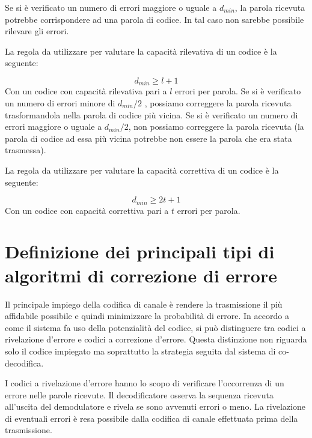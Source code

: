 \documentclass[LaM,binding=0.6cm,oneside]{../sapthesis}
\begin{document}
Se si è verificato un numero di errori maggiore o uguale a $d_{min}$, la
parola ricevuta potrebbe corrispondere ad una parola di codice. In
tal caso non sarebbe possibile rilevare gli errori.

La  regola  da  utilizzare  per  valutare  la  capacità  rilevativa  di  un
codice è la seguente:

\begin{equation}
    d_{min} \geq l + 1  
\end{equation}
Con un codice con capacità rilevativa pari a $l$ errori per parola.
\newline
Se  si  è  verificato  un  numero  di  errori  minore  di  $d_{min}/2$ , possiamo
correggere la parola ricevuta trasformandola nella parola di codice
più vicina.
\newline
Se  si  è  verificato  un  numero  di  errori  maggiore  o  uguale  a  $d_{min}/2$,
non possiamo correggere la parola ricevuta (la parola di codice ad
essa  più  vicina  potrebbe  non  essere  la  parola  che  era  stata
trasmessa).

La  regola  da  utilizzare  per  valutare  la  capacità  correttiva  di  un
codice è la seguente:

\begin{equation}
    d_{min} \geq 2t +1 
\end{equation}
Con un codice con capacità correttiva pari a $t$ errori per parola.



\section{Definizione dei principali tipi di algoritmi di correzione di errore}

Il principale impiego della codifica di canale è rendere la trasmissione il più affidabile possibile e quindi minimizzare la probabilità di errore. In accordo a come il sistema fa uso della potenzialità del codice, si può distinguere tra codici a rivelazione d'errore e codici a correzione d'errore. Questa distinzione non riguarda solo il codice impiegato ma soprattutto la strategia seguita dal sistema di co-decodifica.

I codici a rivelazione d'errore hanno lo scopo di verificare l'occorrenza di un errore nelle parole ricevute. Il decodificatore osserva la sequenza ricevuta all'uscita del demodulatore e rivela se sono avvenuti errori o meno. La rivelazione di eventuali errori è resa possibile dalla codifica di canale effettuata prima della trasmissione. 
\end{document}

